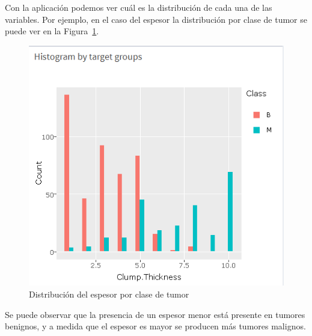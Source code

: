 Con la aplicación podemos ver cuál es la distribución de cada una de las variables. Por ejemplo, en el caso del espesor la distribución por clase de tumor se puede ver en la Figura~\ref{fig:thickness}.\\

\begin{figure}[tbph!]
	\centering
	\includegraphics[width=0.5\linewidth]{imagenes/cancer/thickness.png}
	\caption{Distribución del espesor por clase de tumor}
	\label{fig:thickness}
\end{figure}

Se puede observar que la presencia de un espesor menor está presente en tumores benignos, y a medida que el espesor es mayor se producen más tumores malignos.\\

